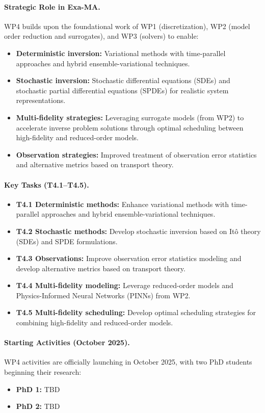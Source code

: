 \paragraph{Strategic Role in Exa-MA.}
WP4 builds upon the foundational work of WP1 (discretization), WP2 (model order reduction and surrogates), and WP3 (solvers) to enable:
\begin{itemize}
\item \textbf{Deterministic inversion:} Variational methods with time-parallel approaches and hybrid ensemble-variational techniques.
\item \textbf{Stochastic inversion:} Stochastic differential equations (SDEs) and stochastic partial differential equations (SPDEs) for realistic system representations.
\item \textbf{Multi-fidelity strategies:} Leveraging surrogate models (from WP2) to accelerate inverse problem solutions through optimal scheduling between high-fidelity and reduced-order models.
\item \textbf{Observation strategies:} Improved treatment of observation error statistics and alternative metrics based on transport theory.
\end{itemize}

\paragraph{Key Tasks (T4.1--T4.5).}
\begin{itemize}
\item \textbf{T4.1 Deterministic methods:} Enhance variational methods with time-parallel approaches and hybrid ensemble-variational techniques.
\item \textbf{T4.2 Stochastic methods:} Develop stochastic inversion based on Itô theory (SDEs) and SPDE formulations.
\item \textbf{T4.3 Observations:} Improve observation error statistics modeling and develop alternative metrics based on transport theory.
\item \textbf{T4.4 Multi-fidelity modeling:} Leverage reduced-order models and Physics-Informed Neural Networks (PINNs) from WP2.
\item \textbf{T4.5 Multi-fidelity scheduling:} Develop optimal scheduling strategies for combining high-fidelity and reduced-order models.
\end{itemize}

\paragraph{Starting Activities (October 2025).}
WP4 activities are officially launching in October 2025, with two PhD students beginning their research:
\begin{itemize}
\item \textbf{PhD 1:} TBD
\item \textbf{PhD 2:} TBD 
\end{itemize}

